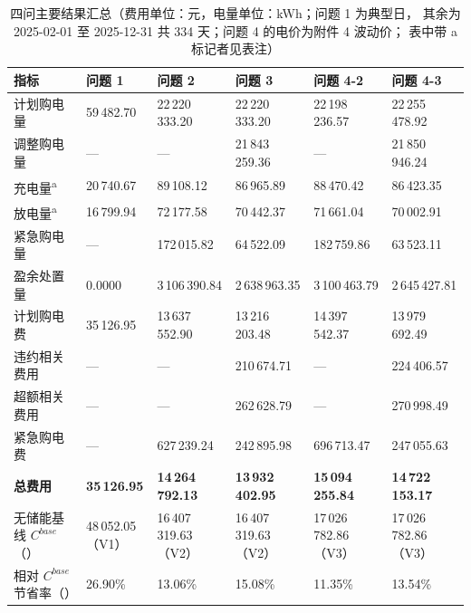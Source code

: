 \begin{table}[htbp]
  \centering
  \caption{四问主要结果汇总（费用单位：元，电量单位：kWh；问题 1 为典型日，
           其余为 2025-02-01 至 2025-12-31 共 334 天；问题 4 的电价为附件 4 波动价；
           表中带 a 标记者见表注）}
  \label{tab:summary}
  \scriptsize
  \setlength{\tabcolsep}{3pt}
  \begin{tabularx}{\linewidth}{L{2.35cm} C{1.60cm} C{1.95cm} C{1.95cm} C{1.95cm} Y}
    \toprule
    指标 & 问题 1 & 问题 2 & 问题 3 & 问题 4-2 & 问题 4-3 \\
    \midrule
    计划购电量 & 59\,482.70 & 22\,220\,333.20 & 22\,220\,333.20 & 22\,198\,236.57 & 22\,255\,478.92 \\
    调整购电量 & --- & --- & 21\,843\,259.36 & --- & 21\,850\,946.24 \\
    充电量\textsuperscript{a} & 20\,740.67 & 89\,108.12 & 86\,965.89 & 88\,470.42 & 86\,423.35 \\
    放电量\textsuperscript{a} & 16\,799.94 & 72\,177.58 & 70\,442.37 & 71\,661.04 & 70\,002.91 \\
    紧急购电量  & --- & 172\,015.82 & 64\,522.09 & 182\,759.86 & 63\,523.11 \\
    盈余处置量  & 0.0000 & 3\,106\,390.84 & 2\,638\,963.35 & 3\,100\,463.79 & 2\,645\,427.81 \\
    计划购电费 & 35\,126.95 & 13\,637\,552.90 & 13\,216\,203.48 & 14\,397\,542.37 & 13\,979\,692.49 \\
    违约相关费用  & --- & --- & 210\,674.71 & --- & 224\,406.57 \\
    超额相关费用  & --- & --- & 262\,628.79 & --- & 270\,998.49 \\
    紧急购电费 & --- & 627\,239.24 & 242\,895.98 & 696\,713.47 & 247\,055.63 \\
    \textbf{总费用} & \textbf{35\,126.95} & \textbf{14\,264\,792.13} & \textbf{13\,932\,402.95} & \textbf{15\,094\,255.84} & \textbf{14\,722\,153.17} \\
    无储能基线 \(C^{base}\)（） & 48\,052.05（V1） & 16\,407\,319.63（V2） & 16\,407\,319.63（V2） & 17\,026\,782.86（V3） & 17\,026\,782.86（V3） \\
    相对 \(C^{base}\) 节省率（） & 26.90\% & 13.06\% & 15.08\% & 11.35\% & 13.54\% \\
    \bottomrule
  \end{tabularx}
  \normalsize
\end{table}


